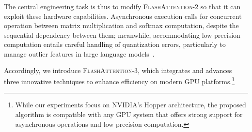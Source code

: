 The central engineering task is thus to modify \textsc{FlashAttention-2} so that it can exploit these hardware capabilities. Asynchronous execution calls for concurrent operation between matrix multiplication and softmax computation, despite the sequential dependency between them; meanwhile, accommodating low-precision computation entails careful handling of quantization errors, particularly to manage outlier features in large language models~\citep{dettmers2208llm, sun2024massive}.

Accordingly, we introduce \textsc{FlashAttention-3}, which integrates and advances three innovative techniques to enhance efficiency on modern GPU platforms.\footnote{While our experiments focus on NVIDIA's Hopper architecture, the proposed algorithm is compatible with any GPU system that offers strong support for asynchronous operations and low-precision computation.}

